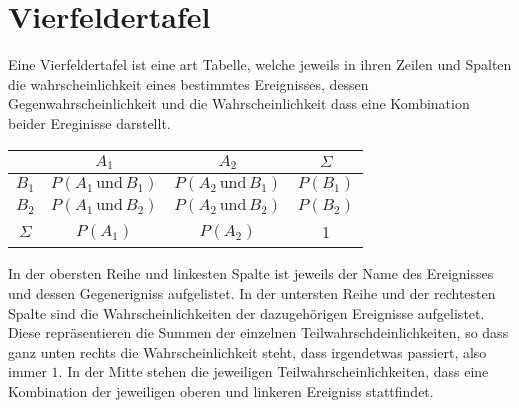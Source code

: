 \documentclass{article}
\begin{document}
 
\section{Vierfeldertafel}
\begin{minipage}{\dimexpr\linewidth-8cm} 
 Eine Vierfeldertafel ist eine art Tabelle, welche jeweils in ihren Zeilen und Spalten die wahrscheinlichkeit eines bestimmtes Ereignisses, dessen Gegenwahrscheinlichkeit und die Wahrscheinlichkeit dass eine Kombination beider Ereginisse darstellt.
 
\end{minipage}
\hfill
\begin{minipage}{8cm}
 \center
 \begin{tabular}{ |c|c|c|c| }
  \hline
        & $A_1$ & $A_2$ & $\Sigma$ \\
  \hline
  $B_1$ & $P(A_1 \,\text{und}\, B_1)$ & $P(A_2 \,\text{und}\, B_1)$ & $P(B_1)$ \\
  \hline
  $B_2$ & $P(A_1 \,\text{und}\, B_2)$ & $P(A_2 \,\text{und}\, B_2)$ & $P(B_2)$ \\
  \hline
  $\Sigma$ & $P(A_1)$ & $P(A_2)$ & 1 \\
  \hline
 \end{tabular}
\end{minipage}
In der obersten Reihe und linkesten Spalte ist jeweils der Name des Ereignisses und dessen Gegenerigniss aufgelistet. In der untersten Reihe und der rechtesten Spalte sind die Wahrscheinlichkeiten der dazugehörigen Ereignisse aufgelistet. Diese repräsentieren die Summen der einzelnen Teilwahrschdeinlichkeiten, so dass ganz unten rechts die Wahrscheinlichkeit steht, dass irgendetwas passiert, also immer $1$. \newline
In der Mitte stehen die jeweiligen Teilwahrscheinlichkeiten, dass eine Kombination der jeweiligen oberen und linkeren Ereigniss stattfindet. 
\end{document}

